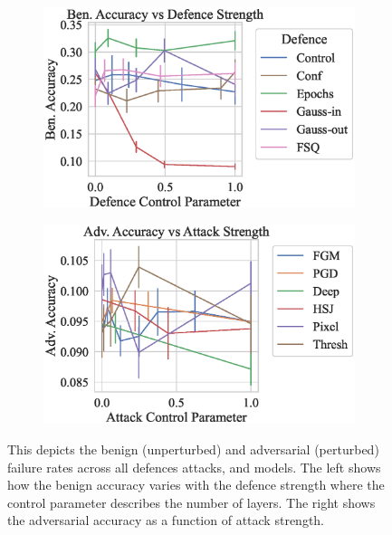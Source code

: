\begin{figure}[!h]
    \centering
    \begin{subfigure}
        \centering
        \includegraphics[trim={0 10pt 0 10pt},clip,width=.48\textwidth]{cifar/def_param_vs_accuracy.eps}
    \end{subfigure}
    \begin{subfigure}
        \centering
        \includegraphics[trim={0 10pt 0 10pt},clip,width=.48\textwidth]{cifar/atk_param_vs_accuracy.eps}
    \end{subfigure}
    \caption{This depicts the benign (unperturbed) and adversarial (perturbed) failure rates across all defences attacks, and models. The left shows how the benign accuracy varies with the defence strength where the control parameter describes the number of layers. The right shows the adversarial accuracy as a function of attack strength.}
    \label{fig:cifar_strength}
\end{figure}

